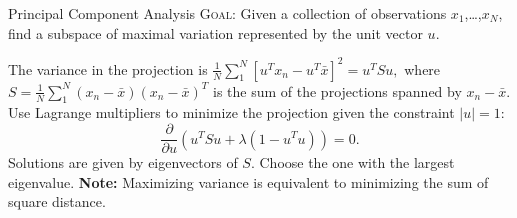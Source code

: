 \documentclass[avery5388, grid]{flashcards}
\begin{document}
\begin{flashcard}{Principal Component Analysis}
\textsc{Goal:} Given a collection of observations $x_1$,\dots,$x_N$, find a subspace of maximal variation represented by the unit vector $u$.\\
\begin{flushleft}
The variance in the projection is $\frac{1}{N}\sum_1^N\left[u^Tx_n -u^T \bar{x}\right]^2=u^TSu,$ where 
$S = \frac{1}{N}\sum_1^N(x_n-\bar{x})(x_n-\bar{x})^T$ is the sum of the projections spanned by $x_n-\bar{x}$. Use Lagrange multipliers to minimize the projection given the constraint $|u|=1$:
$$\frac{\partial}{\partial u}\left(u^TSu + \lambda(1-u^Tu)\right)=0.$$
Solutions are given by eigenvectors of $S$. Choose the one with the largest eigenvalue.
\vskip 5pt
\textsf{\textbf{Note:}} Maximizing variance is equivalent to minimizing the sum of square distance.
\end{flushleft}
\end{flashcard}
\end{document}
